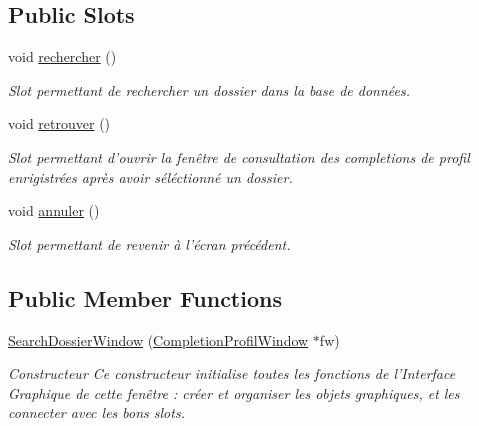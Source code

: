\subsection*{Public Slots}
\begin{DoxyCompactItemize}
\item 
\hypertarget{class_search_dossier_window_a15f74a894eef1feeab8265b025cfc020}{void \hyperlink{class_search_dossier_window_a15f74a894eef1feeab8265b025cfc020}{rechercher} ()}\label{class_search_dossier_window_a15f74a894eef1feeab8265b025cfc020}

\begin{DoxyCompactList}\small\item\em Slot permettant de rechercher un dossier dans la base de données. \end{DoxyCompactList}\item 
\hypertarget{class_search_dossier_window_ae289e7718b2b726e7b1c42bfa87ca836}{void \hyperlink{class_search_dossier_window_ae289e7718b2b726e7b1c42bfa87ca836}{retrouver} ()}\label{class_search_dossier_window_ae289e7718b2b726e7b1c42bfa87ca836}

\begin{DoxyCompactList}\small\item\em Slot permettant d'ouvrir la fenêtre de consultation des completions de profil enrigistrées après avoir séléctionné un dossier. \end{DoxyCompactList}\item 
\hypertarget{class_search_dossier_window_a59fb8abcad92a95d6b7d3d8319abe68e}{void \hyperlink{class_search_dossier_window_a59fb8abcad92a95d6b7d3d8319abe68e}{annuler} ()}\label{class_search_dossier_window_a59fb8abcad92a95d6b7d3d8319abe68e}

\begin{DoxyCompactList}\small\item\em Slot permettant de revenir à l'écran précédent. \end{DoxyCompactList}\end{DoxyCompactItemize}
\subsection*{Public Member Functions}
\begin{DoxyCompactItemize}
\item 
\hyperlink{class_search_dossier_window_a9471fbc6309afca4c7b7a3bb68a907d7}{Search\-Dossier\-Window} (\hyperlink{class_completion_profil_window}{Completion\-Profil\-Window} $\ast$fw)
\begin{DoxyCompactList}\small\item\em Constructeur Ce constructeur initialise toutes les fonctions de l'Interface Graphique de cette fenêtre \-: créer et organiser les objets graphiques, et les connecter avec les bons slots. \end{DoxyCompactList}\end{DoxyCompactItemize}
